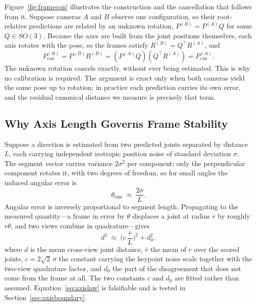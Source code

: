 \documentclass[12pt,a4paper]{report}
\begin{document}
Figure~\ref{fig:framecon} illustrates the construction and the cancellation that
follows from it. Suppose cameras $A$ and $B$ observe one configuration, so their root-relative predictions are related by an unknown rotation, $P^{(B)} = P^{(A)} Q$ for some $Q \in SO(3)$. Because the axes are built from the joint positions themselves, each axis rotates with the pose, so the frames satisfy $R^{(B)} = Q^{\top} R^{(A)}$, and
\begin{equation}
P^{(B)}_{\text{can}} = P^{(B)} R^{(B)} = \left(P^{(A)} Q\right)\left(Q^{\top} R^{(A)}\right) = P^{(A)}_{\text{can}} .
\end{equation}
The unknown rotation cancels exactly, without ever being estimated. This is why no calibration is required. The argument is exact only when both cameras yield the same pose up to rotation; in practice each prediction carries its own error, and the residual canonical distance we measure is precisely that term.

\subsection{Why Axis Length Governs Frame Stability}

Suppose a direction is estimated from two predicted joints separated by distance $L$, each carrying independent isotropic position noise of standard deviation $\sigma$. The segment vector carries variance $2\sigma^2$ per component; only the perpendicular component rotates it, with two degrees of freedom, so for small angles the induced angular error is
\begin{equation}
\theta_{\mathrm{rms}} \;\approx\; \frac{2\sigma}{L} .
\label{eq:theta}
\end{equation}
Angular error is inversely proportional to segment length. Propagating to the measured quantity---a frame in error by $\theta$ displaces a joint at radius $r$ by roughly $r\theta$, and two views combine in quadrature---gives
\begin{equation}
d^{2} \;\approx\; \Big(c\,\frac{\bar{r}}{L}\Big)^{2} + d_0^{2},
\label{eq:axislaw}
\end{equation}
where $d$ is the mean cross-view joint distance, $\bar{r}$ the mean of $r$ over
the scored joints, $c = 2\sqrt{2}\,\sigma$ the constant carrying the keypoint
noise scale together with the two-view quadrature factor, and $d_0$ the part of
the disagreement that does not come from the frame at all. The two constants $c$
and $d_0$ are fitted rather than assumed. Equation~\eqref{eq:axislaw} is
falsifiable and is tested in Section~\ref{sec:axisboundary}.
\end{document}
